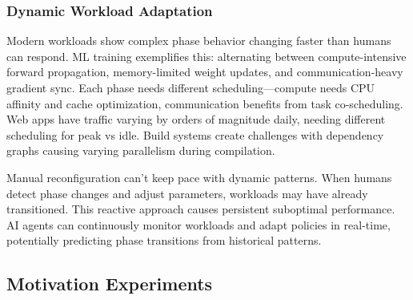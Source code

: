 \subsubsection{Dynamic Workload Adaptation}

Modern workloads show complex phase behavior changing faster than humans can respond. ML training exemplifies this: alternating between compute-intensive forward propagation, memory-limited weight updates, and communication-heavy gradient sync. Each phase needs different scheduling—compute needs CPU affinity and cache optimization, communication benefits from task co-scheduling. Web apps have traffic varying by orders of magnitude daily, needing different scheduling for peak vs idle. Build systems create challenges with dependency graphs causing varying parallelism during compilation.

Manual reconfiguration can't keep pace with dynamic patterns. When humans detect phase changes and adjust parameters, workloads may have already transitioned. This reactive approach causes persistent suboptimal performance. AI agents can continuously monitor workloads and adapt policies in real-time, potentially predicting phase transitions from historical patterns.

\subsection{Motivation Experiments}

